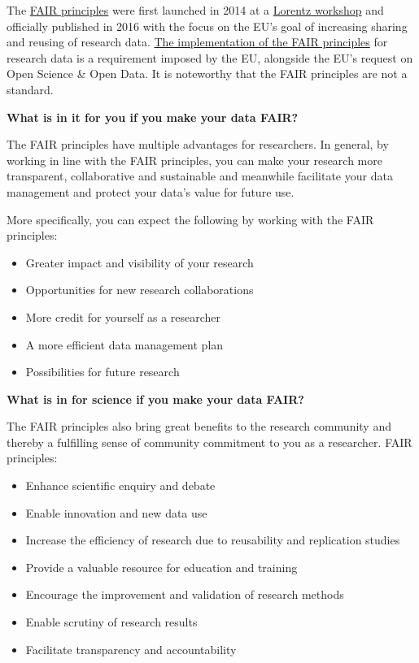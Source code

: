 \documentclass[
]{book}
\providecommand{\tightlist}{%
  \setlength{\itemsep}{0pt}\setlength{\parskip}{0pt}}
\begin{document}
The \href{https://www.go-fair.org/fair-principles/}{FAIR principles} were first launched in 2014 at a \href{https://www.lorentzcenter.nl/}{Lorentz workshop} and officially published in 2016 with the focus on the EU's goal of increasing sharing and reusing of research data. \href{https://eur-lex.europa.eu/legal-content/EN/TXT/?uri=uriserv:OJ.L_.2019.172.01.0056.01.ENG}{The implementation of the FAIR principles} for research data is a requirement imposed by the EU, alongside the EU's request on Open Science \& Open Data. It is noteworthy that the FAIR principles are not a standard.

\textbf{What is in it for you if you make your data FAIR?}

The FAIR principles have multiple advantages for researchers. In general, by working in line with the FAIR principles, you can make your research more transparent, collaborative and sustainable and meanwhile facilitate your data management and protect your data's value for future use.

More specifically, you can expect the following by working with the FAIR principles:

\begin{itemize}
\tightlist
\item
  Greater impact and visibility of your research
\item
  Opportunities for new research collaborations
\item
  More credit for yourself as a researcher
\item
  A more efficient data management plan
\item
  Possibilities for future research
\end{itemize}

\textbf{What is in for science if you make your data FAIR?}

The FAIR principles also bring great benefits to the research community and thereby a fulfilling sense of community commitment to you as a researcher. FAIR principles:

\begin{itemize}
\tightlist
\item
  Enhance scientific enquiry and debate
\item
  Enable innovation and new data use
\item
  Increase the efficiency of research due to reusability and replication studies
\item
  Provide a valuable resource for education and training
\item
  Encourage the improvement and validation of research methods
\item
  Enable scrutiny of research results
\item
  Facilitate transparency and accountability
\end{itemize}
\end{document}
